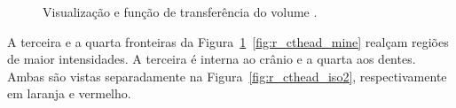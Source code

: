 \begin{figure}[h]
	\centering
	\caption{Visualização e função de transferência do volume .}
	\label{fig:r_cthead}
\end{figure}

	A terceira e a quarta fronteiras da Figura~\ref{fig:r_cthead}~\ref{fig:r_cthead_mine} realçam regiões de maior intensidades. A terceira é interna ao crânio e a quarta aos dentes. Ambas são vistas separadamente na Figura~\ref{fig:r_cthead_iso2}, respectivamente em laranja e vermelho.
	
